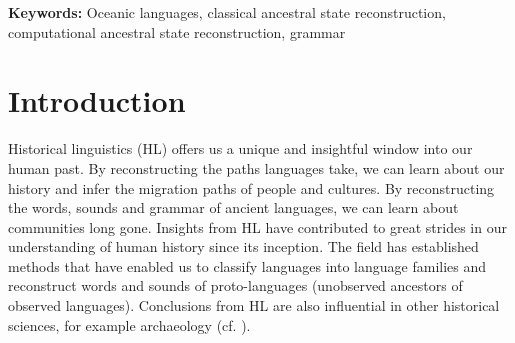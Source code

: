 \documentclass[12pt,letterpaper]{article}
\begin{document}
\begin{abstract}
\end{abstract}


\noindent\textbf{Keywords:} Oceanic languages, classical ancestral state reconstruction, computational ancestral state reconstruction, grammar





\section{Introduction}
\label{acr:intro}
Historical linguistics (HL) offers us a unique and insightful window into our human past. By reconstructing the paths languages take, we can learn about our history and infer the migration paths of people and cultures. By reconstructing the words, sounds and grammar of ancient languages, we can learn about communities long gone. Insights from HL have contributed to great strides in our understanding of human history since its inception. The field has established methods that have enabled us to classify languages into language families and reconstruct words and sounds of proto-languages (unobserved ancestors of observed languages). Conclusions from HL are also influential in other historical sciences, for example archaeology (cf. \citealt[S364]{bellwood2011holocene}).
\end{document}
